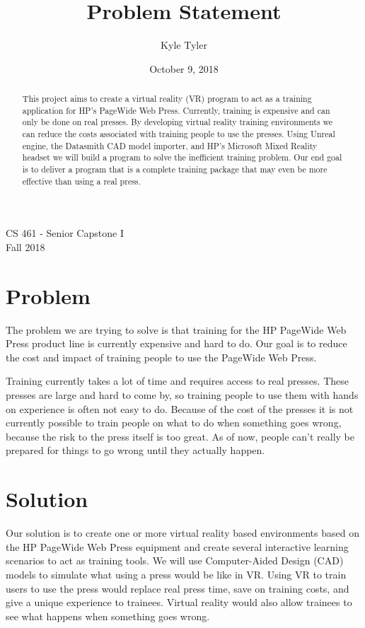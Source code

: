 \documentclass[10pt,draftclsnofoot,onecolumn]{IEEEtran}
\title{Problem Statement}
\author{
    Kyle Tyler
}
\date{October 9, 2018}
\begin{document}
\maketitle

\begin{center}
    CS 461 - Senior Capstone I \\
    Fall 2018
\end{center}
\bigskip

\begin{abstract}

This project aims to create a virtual reality (VR) program to act as a training application for HP's PageWide Web Press. Currently, training is expensive and can only be done on real presses. By developing virtual reality training environments we can reduce the costs associated with training people to use the presses. Using Unreal engine, the Datasmith CAD model importer, and HP's Microsoft Mixed Reality headset we will build a program to solve the inefficient training problem. Our end goal is to deliver a program that is a complete training package that may even be more effective than using a real press. 

\end{abstract}

\clearpage
\section{Problem}
\bigskip

The problem we are trying to solve is that training for the HP PageWide Web Press product line is currently expensive and hard to do. Our goal is to reduce the cost and impact of training people to use the PageWide Web Press. 
\bigskip 
\par Training currently takes a lot of time and requires access to real presses. These presses are large and hard to come by, so training people to use them with hands on experience is often not easy to do. Because of the cost of the presses it is not currently possible to train people on what to do when something goes wrong, because the risk to the press itself is too great. As of now, people can't really be prepared for things to go wrong until they actually happen. 

\section{Solution}
\bigskip

Our solution is to create one or more virtual reality based environments based on the HP PageWide Web Press equipment and create several interactive learning scenarios to act as training tools. We will use Computer-Aided Design (CAD) models to simulate what using a press would be like in VR. Using VR to train users to use the press would replace real press time, save on training costs, and give a unique experience to trainees. Virtual reality would also allow trainees to see what happens when something goes wrong.  
\bigskip
\end{document}
